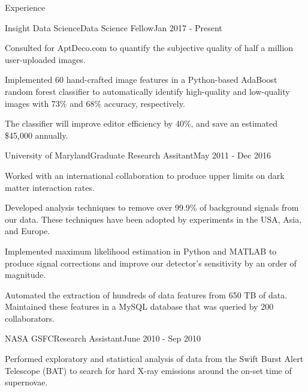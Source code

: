 \documentclass{resume} %
\begin{document}
\begin{rSection}{Experience}

\begin{rSubsection}{Insight Data Science}{Data Science Fellow}{Jan 2017 - Present}{}{ }
\item Consulted for AptDeco.com to quantify the subjective quality of half a million user-uploaded images.
\item Implemented 60 hand-crafted image features in a Python-based AdaBoost random forest classifier to automatically identify high-quality and low-quality images with 73\%  and 68\% accuracy, respectively.
\item The classifier will improve editor efficiency by 40\%, and save an estimated \$45,000 annually.
\end{rSubsection}


\begin{rSubsection}{University of Maryland}{Graduate Research Assitant}{May 2011 - Dec 2016}{}{ }

\item Worked with an international collaboration to produce upper limits on dark matter interaction rates.
\item Developed analysis techniques to remove over 99.9\% of background signals from our data. These techniques have been adopted by experiments in the USA, Asia, and Europe.
\item Implemented maximum likelihood estimation in Python and MATLAB to produce signal corrections and improve our detector's sensitivity by an order of magnitude.
\item Automated the extraction of hundreds of data features from 650 TB of data.  Maintained these features in a MySQL database that was queried by 200 collaborators.


\end{rSubsection}


\begin{rSubsection}{NASA GSFC}{Research Assistant}{June 2010 - Sep 2010}{}{}
\item Performed exploratory and statistical analysis of data from the Swift Burst Alert Telescope (BAT) to search for hard X-ray emissions around the on-set time of supernovae.
\end{rSubsection}

\end{rSection}
\end{document}

